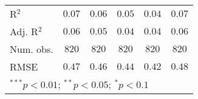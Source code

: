 \begin{table}
\begin{center}
\begin{tabular}{l c c c c c}
R$^2$         & $0.07$        & $0.06$        & $0.05$        & $0.04$        & $0.07$        \\
Adj. R$^2$    & $0.06$        & $0.05$        & $0.04$        & $0.04$        & $0.06$        \\
Num. obs.     & $820$         & $820$         & $820$         & $820$         & $820$         \\
RMSE          & $0.47$        & $0.46$        & $0.44$        & $0.42$        & $0.48$        \\
\bottomrule
\multicolumn{6}{l}{\scriptsize{$^{***}p<0.01$; $^{**}p<0.05$; $^{*}p<0.1$}}
\end{tabular}
\label{tab_emo_na_group}
\end{center}
\end{table}
